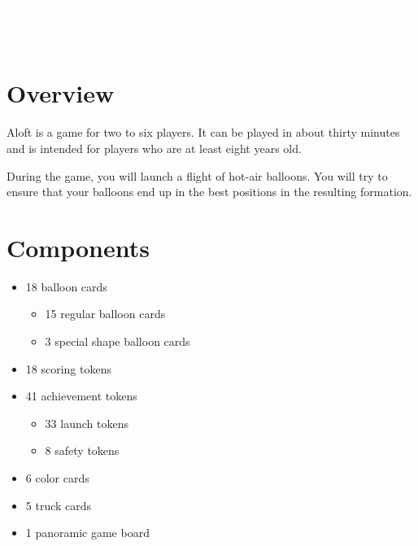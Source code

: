 \documentclass[a6paper, 11pt, parskip=half, DIV=15]{scrartcl}
\begin{document}
\begin{titlepage}

\enlargethispage{3.0\baselineskip}
\Huge
\vspace*{-1.0\baselineskip}
{
\setmainfont[Scale=2.2375]{Oi}
\begin{center}
\textcolor{white}{Aloft}
\end{center}
}
\vfill
\huge
\setmainfont[Scale=1.05]{Playball}
\begin{center}
\textcolor{white}{Designed by Michael Purcell}
\end{center}
\end{titlepage}


\ClearShipoutPicture
\enlargethispage{1.75\baselineskip}
\section*{Overview}
Aloft is a game for two to six players. It can be played in about thirty minutes and is intended for players who are at least eight years old.

During the game, you will launch a flight of hot-air balloons. You will try to ensure that your balloons end up in the best positions in the resulting formation.

\section*{Components}
\begin{itemize}[nosep]
  \item 18 balloon cards
    \begin{itemize}[nosep]
      \item 15 regular balloon cards
      \item 3 special shape balloon cards
    \end{itemize}
  \item 18 scoring tokens
  \item 41 achievement tokens
  \begin{itemize}
  	\item 33 launch tokens
  	\item 8 safety tokens
  \end{itemize}
  \item 6 color cards
  \item 5 truck cards
  \item 1 panoramic game board
\end{itemize}
\end{document}
